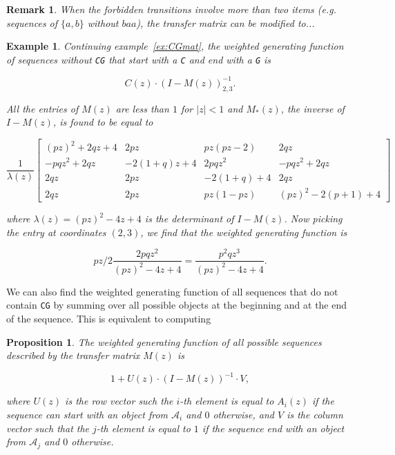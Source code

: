 \documentclass{article}
\newtheorem{example}{Example}
\newtheorem{proposition}{Proposition}
\newtheorem{remark}{Remark}
\begin{document}
\begin{remark}
When the forbidden transitions involve more than two items (\textit{e.g.}
sequences of $\{a,b\}$ without $baa$), the transfer matrix can be modified
to...
\end{remark}

\begin{example}
\label{ex:CGmat2}
Continuing example~\ref{ex:CGmat}, the weighted generating function of
sequences without \texttt{CG} that start with a \texttt{C} and end with a
\texttt{G} is

\begin{equation*}
C(z) \cdot (I-M(z))^{-1}_{2,3}.
\end{equation*}

All the entries of $M(z)$ are less than $1$ for $|z| < 1$ and $M_*(z)$,
the inverse of $I-M(z)$, is found to be equal to 

\begin{equation*}
\frac{1}{\lambda(z)} \left[
\begin{matrix}
(pz)^2+2qz+4   & 2pz        & pz(pz-2)   & 2qz                \\
-pqz^2+2qz     & -2(1+q)z+4 & 2pqz^2     & -pqz^2+2qz         \\
2qz            & 2pz        & -2(1+q)+4  & 2qz                \\
2qz            & 2pz        & pz(1-pz)   & (pz)^2 - 2(p+1) +4
\end{matrix}
\right]
\end{equation*}

\noindent
where $\lambda(z) = (pz)^2 - 4z + 4$ is the determinant of $I-M(z)$. Now
picking the entry at coordinates $(2,3)$, we find that the weighted
generating function is

\begin{equation*}
pz/2\frac{2pqz^2}{(pz)^2 - 4z + 4}
= \frac{p^2qz^3}{(pz)^2 - 4z + 4}.
\end{equation*}
\end{example}

We can also find the weighted generating function of all sequences that do
not contain \texttt{CG} by summing over all possible objects at the
beginning and at the end of the sequence. This is equivalent to computing

\begin{proposition}
The weighted generating function of all possible sequences described by
the transfer matrix $M(z)$ is 

\begin{equation}
1 + U(z) \cdot (I-M(z))^{-1} \cdot V,
\end{equation}

\noindent
where $U(z)$ is the row vector such the $i$-th element is equal to
$A_i(z)$ if the sequence can start with an object from $\mathcal{A}_i$ and
$0$ otherwise, and $V$ is the column vector such that the $j$-th element
is equal to $1$ if the sequence end with an object from $\mathcal{A}_j$
and $0$ otherwise.
\end{proposition}
\end{document}
